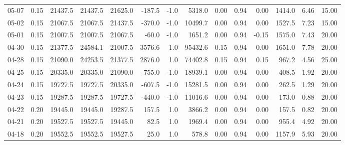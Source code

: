 \begin{threeparttable}
{\begin{tabular}{lrrrrrrrrrrrrr}
  05-07 &     0.15 & 21437.5 & 21437.5 & 21625.0 &     -187.5 &                     -1.0 &              5318.0 &       0.00 &      0.94 &           0.00 &           1414.0 &            6.46 &                  15.00 \\
  05-02 &     0.15 & 21067.5 & 21067.5 & 21437.5 &     -370.0 &                     -1.0 &             10499.7 &       0.00 &      0.94 &           0.00 &           1527.5 &            7.23 &                  15.00 \\
  05-01 &     0.15 & 21007.5 & 21007.5 & 21067.5 &      -60.0 &                     -1.0 &              1651.2 &       0.00 &      0.94 &          -0.15 &           1575.0 &            7.43 &                  20.00 \\
  04-30 &     0.15 & 21377.5 & 24584.1 & 21007.5 &     3576.6 &                      1.0 &             95432.6 &       0.15 &      0.94 &           0.00 &           1651.0 &            7.78 &                  20.00 \\
  04-28 &     0.15 & 21090.0 & 24253.5 & 21377.5 &     2876.0 &                      1.0 &             74402.8 &       0.15 &      0.94 &           0.15 &            967.2 &            4.56 &                  25.00 \\
  04-25 &     0.15 & 20335.0 & 20335.0 & 21090.0 &     -755.0 &                     -1.0 &             18939.1 &       0.00 &      0.94 &           0.00 &            408.5 &            1.92 &                  20.00 \\
  04-24 &     0.15 & 19727.5 & 19727.5 & 20335.0 &     -607.5 &                     -1.0 &             15281.5 &       0.00 &      0.94 &           0.00 &            262.5 &            1.29 &                  20.00 \\
  04-23 &     0.15 & 19287.5 & 19287.5 & 19727.5 &     -440.0 &                     -1.0 &             11016.6 &       0.00 &      0.94 &           0.00 &            173.0 &            0.88 &                  20.00 \\
  04-22 &     0.20 & 19445.0 & 19445.0 & 19287.5 &      157.5 &                      1.0 &              3866.2 &       0.00 &      0.94 &           0.00 &            157.5 &            0.82 &                  20.00 \\
  04-21 &     0.20 & 19527.5 & 19527.5 & 19445.0 &       82.5 &                      1.0 &              1969.4 &       0.00 &      0.94 &           0.00 &            955.4 &            4.92 &                  20.00 \\
  04-18 &     0.20 & 19552.5 & 19552.5 & 19527.5 &       25.0 &                      1.0 &               578.8 &       0.00 &      0.94 &           0.00 &           1157.9 &            5.93 &                  20.00 \\

\end{tabular}}
\end{threeparttable}
